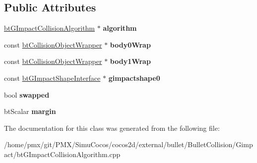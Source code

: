 \subsection*{Public Attributes}
\begin{DoxyCompactItemize}
\item 
\mbox{\label{classbtGImpactTriangleCallback_a3510328454e139e9f31b5da698464307}} 
\hyperlink{classbtGImpactCollisionAlgorithm}{bt\+G\+Impact\+Collision\+Algorithm} $\ast$ {\bfseries algorithm}
\item 
\mbox{\label{classbtGImpactTriangleCallback_abb33f5635be7618e8df24fbeb04eb3db}} 
const \hyperlink{structbtCollisionObjectWrapper}{bt\+Collision\+Object\+Wrapper} $\ast$ {\bfseries body0\+Wrap}
\item 
\mbox{\label{classbtGImpactTriangleCallback_a244f582f9ade39bb7709b5d4472cb560}} 
const \hyperlink{structbtCollisionObjectWrapper}{bt\+Collision\+Object\+Wrapper} $\ast$ {\bfseries body1\+Wrap}
\item 
\mbox{\label{classbtGImpactTriangleCallback_a875310649da0b01efb1ce1474abaed44}} 
const \hyperlink{classbtGImpactShapeInterface}{bt\+G\+Impact\+Shape\+Interface} $\ast$ {\bfseries gimpactshape0}
\item 
\mbox{\label{classbtGImpactTriangleCallback_a9c586a375d8f5d2def030e8890aba1db}} 
bool {\bfseries swapped}
\item 
\mbox{\label{classbtGImpactTriangleCallback_a55bde3e2ba0cd5f24785c70bcc72b5a2}} 
bt\+Scalar {\bfseries margin}
\end{DoxyCompactItemize}


The documentation for this class was generated from the following file\+:\begin{DoxyCompactItemize}
\item 
/home/pmx/git/\+P\+M\+X/\+Simu\+Cocos/cocos2d/external/bullet/\+Bullet\+Collision/\+Gimpact/bt\+G\+Impact\+Collision\+Algorithm.\+cpp\end{DoxyCompactItemize}
